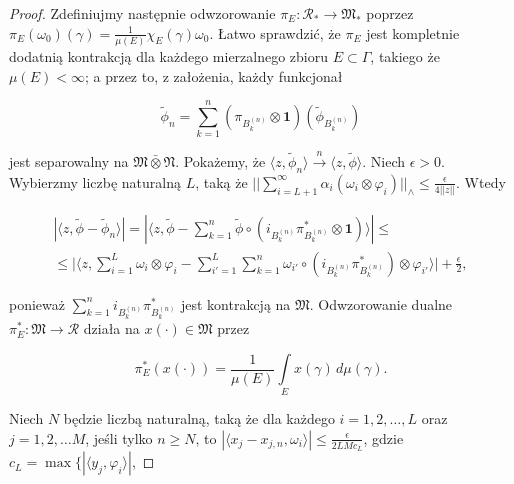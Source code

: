 \begin{proof}
Zdefiniujmy następnie odwzorowanie
$\pi_{E}: \mathcal{R}_{*} \rightarrow \mathfrak{M}_{*}$
poprzez $\pi_{E}(\omega_{0})(\gamma) =\frac{1}{\mu(E)} \chi_{E}(\gamma)\omega_{0}$.
Łatwo sprawdzić, że $\pi_{E}$ jest kompletnie dodatnią kontrakcją dla każdego
mierzalnego zbioru $E \subset \Gamma$, takiego że $\mu(E) < \infty$;
a przez to, z założenia, każdy funkcjonał
\begin{linenomath*}
 \begin{equation}
\tilde{\phi}_{n} = \sum \limits_{k=1}^{n}
(\pi_{B_{k}^{(n)}} \otimes \mathbf{1})
( \tilde{\phi}_{B_{k}^{(n)}} )
 \end{equation}
\end{linenomath*}
jest separowalny na $\mathfrak{M} \bar{\otimes} \mathfrak{N}$.
Pokażemy, że $\langle z , \tilde{\phi}_{n} \rangle
\stackrel{n}{\rightarrow}\langle z , \tilde{\phi} \rangle$.
Niech $\epsilon > 0$.
Wybierzmy liczbę naturalną $L$, taką że
$|| \sum_{i=L+1}^{\infty}\alpha_i(\omega_{i} \otimes \varphi_{i}) ||_{\wedge}
\leq \frac{\epsilon}{4 ||z||}$.
Wtedy
\begin{linenomath*}
 \begin{multline}
\label{eq:longineq}
|\langle z, \tilde{\phi} - \tilde{\phi}_{n} \rangle| =
|\langle z, \tilde{\phi} -\sum \limits_{k=1}^{n} \tilde{\phi}
\circ (i_{B_{k}^{(n)}} \pi^{*}_{B_{k}^{(n)}} \otimes \mathbf{1})
\rangle | \leq \\
\leq \Big |\langle z,\sum \limits_{i=1}^{L} \omega_{i} \otimes \varphi_{i} -
\sum \limits_{i'=1}^{L}\sum \limits_{k=1}^{n}
\omega_{i'} \circ (i_{B_{k}^{(n)}} \pi^{*}_{B_{k}^{(n)}})
\otimes \varphi_{i'}
\rangle \Big | + \frac{\epsilon}{2},
 \end{multline}
\end{linenomath*}
ponieważ $\sum_{k=1}^{n} i_{B_{k}^{(n)}} \pi^{*}_{B_{k}^{(n)}}$
jest kontrakcją na $\mathfrak{M}$.
Odwzorowanie dualne
$\pi^{*}_{E}: \mathfrak{M} \rightarrow \mathcal{R}$
działa na $x(\cdot) \in \mathfrak{M}$ przez
\begin{linenomath*}
 \begin{equation}
\label{eq:intergralpi}
\pi^{*}_{E}(x(\cdot)) = \frac{1}{\mu(E)}
\int \limits_{E} x(\gamma) \, d\mu(\gamma).
 \end{equation}
\end{linenomath*}
Niech $N$ będzie liczbą naturalną, taką że dla każdego $i = 1, 2, \ldots, L$
oraz $j = 1,2, \ldots M$, jeśli tylko $n \geq N$,
to $|\langle x_{j} - x_{j,n}, \omega_{i} \rangle| \leq
\frac{\epsilon}{2 L M c_{L} }$, gdzie
$c_{L} = \max \{ |\langle y_{j}, \varphi_{i} \rangle |$,

\end{proof}
